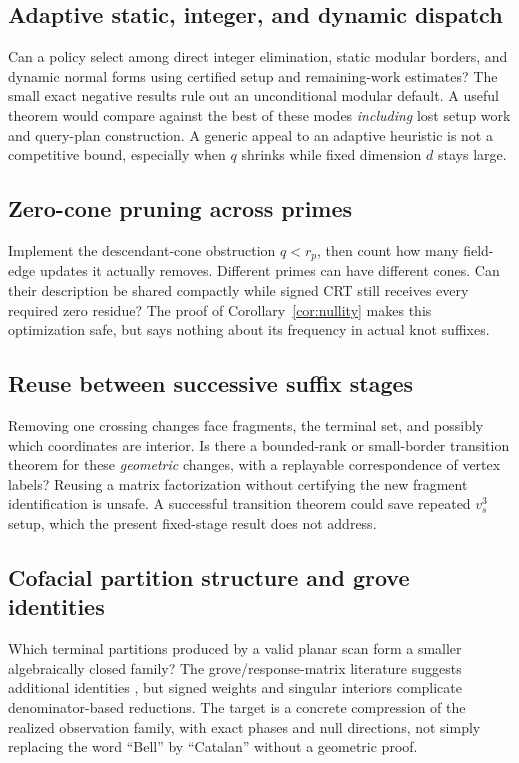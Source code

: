 \documentclass[11pt,letterpaper]{article}
\theoremstyle{definition}\newtheorem{definition}[theorem]{Definition}
\theoremstyle{remark}\newtheorem{remark}[theorem]{Remark}
\begin{document}
\subsection{Adaptive static, integer, and dynamic dispatch}
Can a policy select among direct integer elimination, static modular borders, and dynamic normal forms using certified setup and remaining-work estimates? The small exact negative results rule out an unconditional modular default. A useful theorem would compare against the best of these modes \emph{including} lost setup work and query-plan construction. A generic appeal to an adaptive heuristic is not a competitive bound, especially when $q$ shrinks while fixed dimension $d$ stays large.

\subsection{Zero-cone pruning across primes}
Implement the descendant-cone obstruction $q<r_p$, then count how many field-edge updates it actually removes. Different primes can have different cones. Can their description be shared compactly while signed CRT still receives every required zero residue? The proof of Corollary~\ref{cor:nullity} makes this optimization safe, but says nothing about its frequency in actual knot suffixes.

\subsection{Reuse between successive suffix stages}
Removing one crossing changes face fragments, the terminal set, and possibly which coordinates are interior. Is there a bounded-rank or small-border transition theorem for these \emph{geometric} changes, with a replayable correspondence of vertex labels? Reusing a matrix factorization without certifying the new fragment identification is unsafe. A successful transition theorem could save repeated $v_s^3$ setup, which the present fixed-stage result does not address.

\subsection{Cofacial partition structure and grove identities}
Which terminal partitions produced by a valid planar scan form a smaller algebraically closed family? The grove/response-matrix literature suggests additional identities \cite{kenyonwilson}, but signed weights and singular interiors complicate denominator-based reductions. The target is a concrete compression of the realized observation family, with exact phases and null directions, not simply replacing the word ``Bell'' by ``Catalan'' without a geometric proof.
\end{document}
